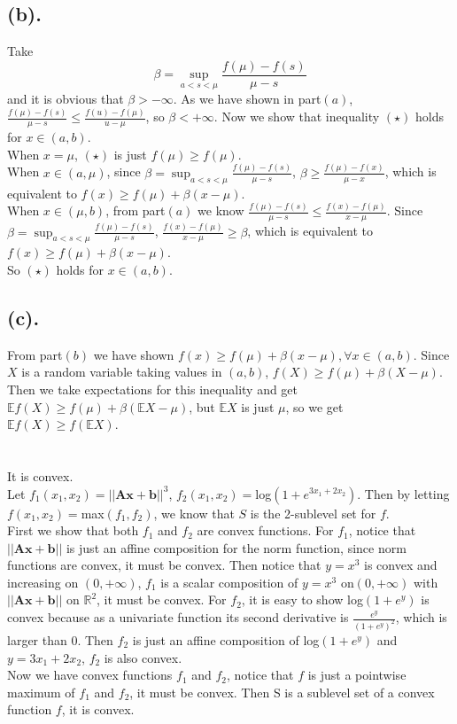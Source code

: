 \documentclass[12pt,letterpaper]{article}
\begin{document}
\subsection*{(b).}
Take $$\beta=\sup_{a<s<\mu}\frac{f(\mu)-f(s)}{\mu-s}$$ and it is obvious that $\beta>-\infty$. As we have shown in part$(a)$, $\frac{f(\mu)-f(s)}{\mu-s}\leq\frac{f(u)-f(\mu)}{u-\mu}$, so $\beta<+\infty$. Now we show that inequality $(\star)$ holds for $x\in(a,b)$.\\
When $x=\mu$, $(\star)$ is just $f(\mu)\geq f(\mu)$.\\
When $x\in(a,\mu)$, since $\beta=\sup_{a<s<\mu}\frac{f(\mu)-f(s)}{\mu-s}$, $\beta\geq\frac{f(\mu)-f(x)}{\mu-x}$, which is equivalent to $f(x)\geq f(\mu)+\beta(x-\mu)$.\\
When $x\in(\mu,b)$, from part$(a)$ we know $\frac{f(\mu)-f(s)}{\mu-s}\leq\frac{f(x)-f(\mu)}{x-\mu}$. Since $\beta=\sup_{a<s<\mu}\frac{f(\mu)-f(s)}{\mu-s}$, $\frac{f(x)-f(\mu)}{x-\mu}\geq\beta$, which is equivalent to $f(x)\geq f(\mu)+\beta(x-\mu)$.\\
So $(\star)$ holds for $x\in(a,b)$.
\subsection*{(c).}
From part$(b)$ we have shown $f(x)\geq f(\mu)+\beta(x-\mu), \forall x\in(a,b)$. Since $X$ is a random variable taking values in $(a,b)$, $f(X)\geq f(\mu)+\beta(X-\mu)$. Then we take expectations for this inequality and get $\mathbb{E}f(X)\geq f(\mu)+\beta(\mathbb{E}X-\mu)$, but $\mathbb{E}X$ is just $\mu$, so we get $\mathbb{E}f(X)\geq f(\mathbb{E}X)$.
\section{}
It is convex.\\
Let $f_1(x_1,x_2)=||\boldsymbol{Ax}+\boldsymbol{b}||^3$, $f_2(x_1,x_2)=$log$(1+e^{3x_1+2x_2})$. Then by letting $f(x_1,x_2)=$max$(f_1,f_2)$, we know that $S$ is the 2-sublevel set for $f$.\\
First we show that both $f_1$ and $f_2$ are convex functions. For $f_1$, notice that $||\boldsymbol{Ax}+\boldsymbol{b}||$ is just an affine composition for the norm function, since norm functions are convex, it must be convex. Then notice that $y=x^3$ is convex and increasing on $(0,+\infty)$, $f_1$ is a scalar composition of $y=x^3$ on$(0,+\infty)$ with $||\boldsymbol{Ax}+\boldsymbol{b}||$ on $\mathbb{R}^2$, it must be convex. For $f_2$, it is easy to show log$(1+e^y)$ is convex because as a univariate function its second derivative is $\frac{e^y}{(1+e^y)^2}$, which is larger than 0. Then $f_2$ is just an affine composition of log$(1+e^y)$ and $y=3x_1+2x_2$, $f_2$ is also convex.\\
Now we have convex functions $f_1$ and $f_2$, notice that $f$ is just a pointwise maximum of $f_1$ and $f_2$, it must be convex. Then S is a sublevel set of a convex function $f$, it is convex.
\end{document}
